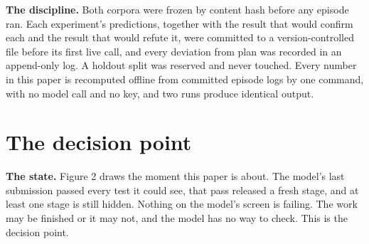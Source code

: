 \documentclass[11pt]{article}
\begin{document}
\begin{table}[t]
\caption{\textbf{The programme at a glance.} Every run in the programme that called a real model. A \textbf{task} is one broken Python function with a test suite; the function's correct behaviour depends on a convention the model is never told, and some of the tests that enforce it are hidden from the model at the start. An \textbf{episode} is one model working one task until it stops, and \emph{tasks played} counts the episodes that completed. Saying \textbf{DONE} is a reply of that single word, which asserts the task is finished including the parts the model was never shown; the harness then scores the assertion against the hidden tests and the model is never told the answer. \emph{Times DONE was wrong} counts the episodes where a hidden test failed after the model said DONE. The BIND runs have no way to say DONE, which is why their claim columns are zero by construction rather than by behaviour. Saying DONE after every stage has been released is the ordinary correct way to finish and is almost never wrong; the column that matters is the next one, which counts only the DONEs said \textbf{while stages were still hidden}, and Table 2 splits every claim by that distinction. Six further runs against offline stubs are instrument checks and are excluded here, as is \$6.04 of earlier calibration probing that produced no episode. \textbf{The eleven runs cost \$55.21 and produced 74 wrong claims of completion across 856 episodes.} Regenerated from \texttt{declare/data/} by \texttt{tables/make\_tables.py}.}
\label{tab:T1}
\end{table}

\textbf{The discipline.} Both corpora were frozen by content hash before any episode ran. Each experiment's predictions, together with the result that would confirm each and the result that would refute it, were committed to a version-controlled file before its first live call, and every deviation from plan was recorded in an append-only log. A holdout split was reserved and never touched. Every number in this paper is recomputed offline from committed episode logs by one command, with no model call and no key, and two runs produce identical output.

\section{The decision point}

\textbf{The state.} Figure 2 draws the moment this paper is about. The model's last submission passed every test it could see, that pass released a fresh stage, and at least one stage is still hidden. Nothing on the model's screen is failing. The work may be finished or it may not, and the model has no way to check. This is the decision point.
\end{document}

